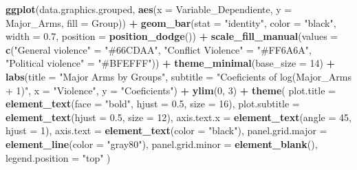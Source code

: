 \documentclass[
  11pt,
]{article}
\newenvironment{Shaded}{\begin{snugshade}}{\end{snugshade}}
\newcommand{\AttributeTok}[1]{\textcolor[rgb]{0.13,0.29,0.53}{#1}}
\newcommand{\DecValTok}[1]{\textcolor[rgb]{0.00,0.00,0.81}{#1}}
\newcommand{\FloatTok}[1]{\textcolor[rgb]{0.00,0.00,0.81}{#1}}
\newcommand{\FunctionTok}[1]{\textcolor[rgb]{0.13,0.29,0.53}{\textbf{#1}}}
\newcommand{\NormalTok}[1]{#1}
\newcommand{\OtherTok}[1]{\textcolor[rgb]{0.56,0.35,0.01}{#1}}
\newcommand{\SpecialCharTok}[1]{\textcolor[rgb]{0.81,0.36,0.00}{\textbf{#1}}}
\newcommand{\StringTok}[1]{\textcolor[rgb]{0.31,0.60,0.02}{#1}}
\begin{document}
\begin{Shaded}
\begin{Highlighting}[]
\FunctionTok{ggplot}\NormalTok{(data.graphics.grouped, }\FunctionTok{aes}\NormalTok{(}\AttributeTok{x =}\NormalTok{ Variable\_Dependiente, }\AttributeTok{y =}\NormalTok{ Major\_Arms, }\AttributeTok{fill =}\NormalTok{ Group)) }\SpecialCharTok{+}
  \FunctionTok{geom\_bar}\NormalTok{(}\AttributeTok{stat =} \StringTok{"identity"}\NormalTok{, }\AttributeTok{color =} \StringTok{"black"}\NormalTok{, }\AttributeTok{width =} \FloatTok{0.7}\NormalTok{, }\AttributeTok{position =} \FunctionTok{position\_dodge}\NormalTok{()) }\SpecialCharTok{+}
  \FunctionTok{scale\_fill\_manual}\NormalTok{(}\AttributeTok{values =} \FunctionTok{c}\NormalTok{(}\StringTok{"General violence"} \OtherTok{=} \StringTok{"\#66CDAA"}\NormalTok{, }\StringTok{"Conflict Violence"} \OtherTok{=} \StringTok{"\#FF6A6A"}\NormalTok{, }\StringTok{"Political violence"} \OtherTok{=} \StringTok{"\#BFEFFF"}\NormalTok{)) }\SpecialCharTok{+}
  \FunctionTok{theme\_minimal}\NormalTok{(}\AttributeTok{base\_size =} \DecValTok{14}\NormalTok{) }\SpecialCharTok{+}
  \FunctionTok{labs}\NormalTok{(}\AttributeTok{title =} \StringTok{"Major Arms by Groups"}\NormalTok{,}
       \AttributeTok{subtitle =} \StringTok{"Coeficients of log(Major\_Arms + 1)"}\NormalTok{,}
       \AttributeTok{x =} \StringTok{"Violence"}\NormalTok{,}
       \AttributeTok{y =} \StringTok{"Coeficients"}\NormalTok{) }\SpecialCharTok{+}
  \FunctionTok{ylim}\NormalTok{(}\DecValTok{0}\NormalTok{, }\DecValTok{3}\NormalTok{) }\SpecialCharTok{+}
  \FunctionTok{theme}\NormalTok{(}
    \AttributeTok{plot.title =} \FunctionTok{element\_text}\NormalTok{(}\AttributeTok{face =} \StringTok{"bold"}\NormalTok{, }\AttributeTok{hjust =} \FloatTok{0.5}\NormalTok{, }\AttributeTok{size =} \DecValTok{16}\NormalTok{),}
    \AttributeTok{plot.subtitle =} \FunctionTok{element\_text}\NormalTok{(}\AttributeTok{hjust =} \FloatTok{0.5}\NormalTok{, }\AttributeTok{size =} \DecValTok{12}\NormalTok{),}
    \AttributeTok{axis.text.x =} \FunctionTok{element\_text}\NormalTok{(}\AttributeTok{angle =} \DecValTok{45}\NormalTok{, }\AttributeTok{hjust =} \DecValTok{1}\NormalTok{),}
    \AttributeTok{axis.text =} \FunctionTok{element\_text}\NormalTok{(}\AttributeTok{color =} \StringTok{"black"}\NormalTok{),}
    \AttributeTok{panel.grid.major =} \FunctionTok{element\_line}\NormalTok{(}\AttributeTok{color =} \StringTok{"gray80"}\NormalTok{),}
    \AttributeTok{panel.grid.minor =} \FunctionTok{element\_blank}\NormalTok{(),}
    \AttributeTok{legend.position =} \StringTok{"top"}
\NormalTok{  )}
\end{Highlighting}
\end{Shaded}
\end{document}
